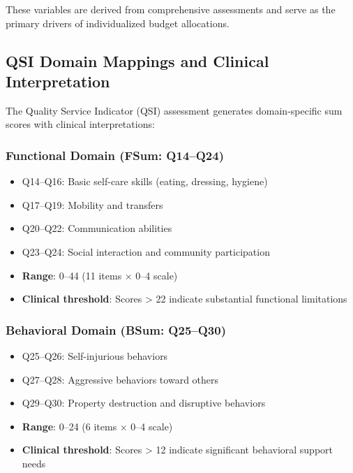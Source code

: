 These variables are derived from comprehensive assessments and serve as the primary drivers of individualized budget allocations.

\subsection{QSI Domain Mappings and Clinical Interpretation}

The Quality Service Indicator (QSI) assessment generates domain-specific sum scores with clinical interpretations:

\subsubsection{Functional Domain (FSum: Q14--Q24)}
\begin{itemize}
    \item Q14--Q16: Basic self-care skills (eating, dressing, hygiene)
    \item Q17--Q19: Mobility and transfers
    \item Q20--Q22: Communication abilities
    \item Q23--Q24: Social interaction and community participation
    \item \textbf{Range}: 0--44 (11 items × 0--4 scale)
    \item \textbf{Clinical threshold}: Scores > 22 indicate substantial functional limitations
\end{itemize}

\subsubsection{Behavioral Domain (BSum: Q25--Q30)}
\begin{itemize}
    \item Q25--Q26: Self-injurious behaviors
    \item Q27--Q28: Aggressive behaviors toward others
    \item Q29--Q30: Property destruction and disruptive behaviors
    \item \textbf{Range}: 0--24 (6 items × 0--4 scale)
    \item \textbf{Clinical threshold}: Scores > 12 indicate significant behavioral support needs
\end{itemize}

